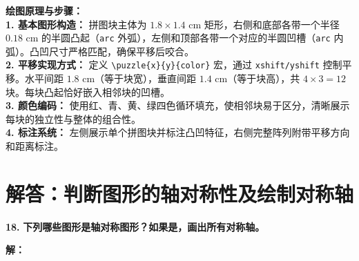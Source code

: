 \begin{center}
\end{center}

\vspace{0.4cm}
{\small\color{blue!70!black}
\textbf{绘图原理与步骤：}\\
\textbf{1. 基本图形构造：} 拼图块主体为 $1.8 \times 1.4$ cm 矩形，右侧和底部各带一个半径 $0.18$ cm 的半圆凸起（\texttt{arc} 外弧），左侧和顶部各带一个对应的半圆凹槽（\texttt{arc} 内弧）。凸凹尺寸严格匹配，确保平移后咬合。\\
\textbf{2. 平移实现方式：} 定义 \texttt{\textbackslash{}puzzle\{x\}\{y\}\{color\}} 宏，通过 \texttt{xshift/yshift} 控制平移。水平间距 $1.8$ cm（等于块宽），垂直间距 $1.4$ cm（等于块高），共 $4 \times 3 = 12$ 块。每块凸起恰好嵌入相邻块的凹槽。\\
\textbf{3. 颜色编码：} 使用红、青、黄、绿四色循环填充，使相邻块易于区分，清晰展示每块的独立性与整体的组合性。\\
\textbf{4. 标注系统：} 左侧展示单个拼图块并标注凸凹特征，右侧完整阵列附带平移方向和距离标注。
}
\newpage



\section{解答：判断图形的轴对称性及绘制对称轴}

\vspace{0.6cm}

\textbf{\LARGE 18.} \textbf{下列哪些图形是轴对称图形？如果是，画出所有对称轴。}

\vspace{0.4cm}
\textbf{解：}

